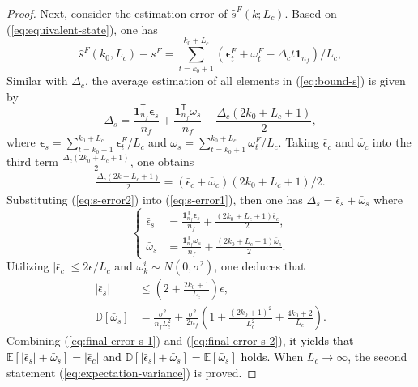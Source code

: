 \documentclass[12pt,journal,draftclsnofoot,onecolumn]{IEEEtran}
\let \sss=\scriptscriptstyle
\begin{document}
\begin{proof}
Next, consider the estimation error of $\hat{s}^{\sss F}(k;L_c)$. 
Based on (\ref{eq:equivalent-state}), one has 
\begin{equation}\label{eq:bound-s}
\hat{s}^{\sss F}(k_0,L_c)- {s}^{\sss F} = \sum\limits_{t = k_0+1}^{k_0+L_c} (\bm{\epsilon}_t^{\sss F} + \omega_t^{\sss F} - \Delta_c t \bm{1}_{n_f})/L_c,
\end{equation}
Similar with $\Delta_c$, the average estimation of all elements in (\ref{eq:bound-s}) is given by 
\begin{equation}\label{eq:s-error1}
\Delta_s= \frac{\bm{1}_{n_f}^\mathsf{T} {\bm\epsilon}_s }{n_f}+ \frac{\bm{1}_{n_f}^\mathsf{T} {\omega}_s }{n_f} - \frac{\Delta_c(2k_0+L_c+1)}{2},
\end{equation}
where ${\bm\epsilon}_s=\sum\limits_{t = k_0+1}^{k_0+L_c} \bm{\epsilon}_t^{\sss F}/L_c$ and ${\omega}_s=\sum\limits_{t = k_0+1}^{k_0+L_c} \omega_t^{\sss F}/L_c$. 
Taking $\bar{\epsilon}_c$ and $\bar{\omega}_c $ into the third term $\frac{\Delta_c(2k_0+L_c+1)}{2}$, one obtains 
\begin{align}\label{eq:s-error2}
\frac{\Delta_c(2k+L_c+1)}{2}=(\bar{\epsilon}_c + \bar{\omega}_c )(2k_0+L_c+1)/2 . 
\end{align}
Substituting (\ref{eq:s-error2}) into (\ref{eq:s-error1}), then one has $\Delta_s= \bar{\epsilon}_s + \bar{\omega}_s$ where 
\begin{equation}\label{eq:epsilon-omega-s}
\left \{
\begin{aligned}
\bar{\epsilon}_s &= \frac{ \bm{1}_{n_f}^\mathsf{T}  {\bm\epsilon}_s }{n_f} + \frac{(2k_0 +L_c+1)\bar{\epsilon}_c}{2}, \nonumber \\
\bar{\omega}_s &= \frac{ \bm{1}_{n_f}^\mathsf{T}  {\omega}_s  }{n_f} + \frac{(2k_0 +L_c+1)\bar{\omega}_c}{2}. \nonumber
\end{aligned} \right.
\end{equation}
Utilizing $|\bar{\epsilon}_c|\le 2 \epsilon/L_c$ and $\omega_k^i\sim N(0,\sigma^2)$, one deduces that 
\begin{align} | \bar{\epsilon}_s | &\le (2+\frac{2k_0+1}{L_c})\epsilon, \label{eq:final-error-s-1}
 \\
\mathbb{D}[\bar{\omega}_s] & \!=\! \frac{\sigma^2}{n_f L_c^2} \!+\! \frac{\sigma^2}{2n_f}(1+ \frac{(2k_0+1)^2}{L_c^2}+ \frac{4k_0+2}{L_c} ). \label{eq:final-error-s-2}
\end{align}
Combining (\ref{eq:final-error-s-1}) and (\ref{eq:final-error-s-2}), \textcolor{black}{it yields that $\mathbb{E}[ | \bar{\epsilon}_s | + \bar{\omega}_s ]=|\bar{\epsilon}_c|$ and $\mathbb{D}[| \bar{\epsilon}_s | + \bar{\omega}_s ]=\mathbb{E}[\bar{\omega}_s ]$ holds.} 
When $L_c \to \infty $, the second statement (\ref{eq:expectation-variance}) is proved. 
\end{proof}
\end{document}
